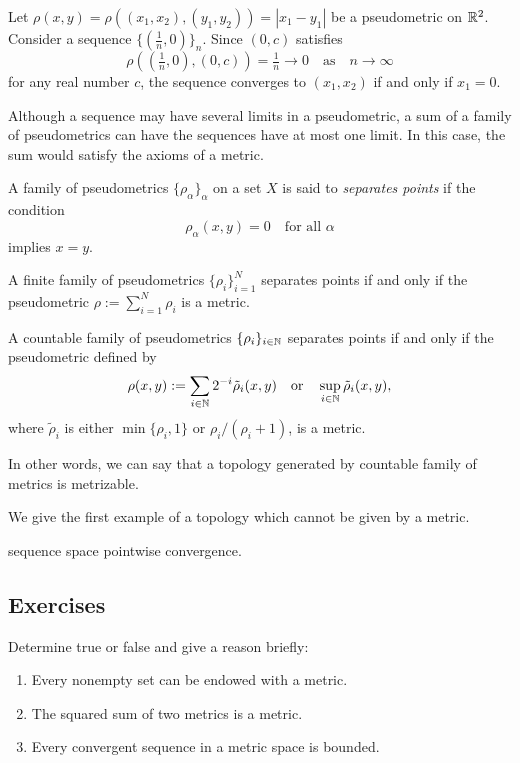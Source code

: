 \begin{ex}
Let $\rho(x,y)=\rho((x_1,x_2),(y_1,y_2))=|x_1-y_1|$ be a pseudometric on $\mathbb{R}^2$.
Consider a sequence $\{(\frac1n,0)\}_n$.
Since $(0,c)$ satisfies 
\[\rho((\tfrac1n,0),(0,c))=\tfrac1n\to0\quad\text{as}\quad n\to\infty\]
for any real number $c$, the sequence converges to $(x_1,x_2)$ if and only if $x_1=0$.
\end{ex}

Although a sequence may have several limits in a pseudometric, a sum of a family of pseudometrics can have the sequences have at most one limit.
In this case, the sum would satisfy the axioms of a metric.

\begin{defn}
A family of pseudometrics $\{\rho_\alpha\}_\alpha$ on a set $X$ is said to \emph{separates points} if the condition 
\[\rho_\alpha(x,y)=0\quad\text{for all $\alpha$}\]
implies $x=y$.
\end{defn}
\begin{prop}
A finite family of pseudometrics $\{\rho_i\}_{i=1}^N$ separates points if and only if the pseudometric $\rho:=\sum_{i=1}^N\rho_i$ is a metric.
\end{prop}
\begin{prop}
A countable family of pseudometrics $\{\rho_i\}_{i\in\mathbb{N}}$ separates points if and only if the pseudometric defined by
\[\rho(x,y):=\sum_{i\in\mathbb{N}}2^{-i}\tilde\rho_i(x,y)\quad\text{or}\quad\sup_{i\in\mathbb{N}}\tilde\rho_i(x,y),\]
where $\tilde\rho_i$ is either $\min\{\rho_i,1\}$ or $\rho_i/(\rho_i+1)$, is a metric.
\end{prop}


In other words, we can say that a topology generated by countable family of metrics is metrizable.

We give the first example of a topology which cannot be given by a metric.

\begin{ex}
sequence space pointwise convergence.
\end{ex}




\clearpage
\subsection*{Exercises}
Determine true or false and give a reason briefly:
\begin{enumerate}
\item Every nonempty set can be endowed with a metric.
\item The squared sum of two metrics is a metric.
\item Every convergent sequence in a metric space is bounded.
\end{enumerate}

